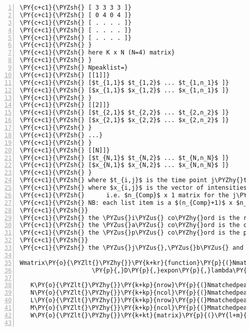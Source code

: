 \begin{Verbatim}[commandchars=\\\{\},codes={\catcode`\$=3\catcode`\^=7\catcode`\_=8},gobble=0,numbers=left,fontfamily=fvm,fontshape=n,fontsize=\footnotesize,tabsize=2]
\PY{c+c1}{\PYZsh{} [ 3 3 3 3 ]}
\PY{c+c1}{\PYZsh{} [ 0 4 0 4 ]}
\PY{c+c1}{\PYZsh{} [ . . . . ]}
\PY{c+c1}{\PYZsh{} [ . . . . ]}
\PY{c+c1}{\PYZsh{} [ . . . . ]}
\PY{c+c1}{\PYZsh{} }
\PY{c+c1}{\PYZsh{} here K x N (N=4) matrix}
\PY{c+c1}{\PYZsh{} }
\PY{c+c1}{\PYZsh{} Npeaklist=}
\PY{c+c1}{\PYZsh{} [[1]]}
\PY{c+c1}{\PYZsh{} [$t_{1,1}$ $t_{1,2}$ ... $t_{1,n_1}$ ]}
\PY{c+c1}{\PYZsh{} [$x_{1,1}$ $x_{1,2}$ ... $x_{1,n_1}$ ]}
\PY{c+c1}{\PYZsh{} }
\PY{c+c1}{\PYZsh{} [[2]]}
\PY{c+c1}{\PYZsh{} [$t_{2,1}$ $t_{2,2}$ ... $t_{2,n_2}$ ]}
\PY{c+c1}{\PYZsh{} [$x_{2,1}$ $x_{2,2}$ ... $x_{2,n_2}$ ]}
\PY{c+c1}{\PYZsh{} }
\PY{c+c1}{\PYZsh{} ...}
\PY{c+c1}{\PYZsh{} }
\PY{c+c1}{\PYZsh{} [[N]]}
\PY{c+c1}{\PYZsh{} [$t_{N,1}$ $t_{N,2}$ ... $t_{N,n_N}$ ]}
\PY{c+c1}{\PYZsh{} [$x_{N,1}$ $x_{N,2}$ ... $x_{N,n_N}$ ]}
\PY{c+c1}{\PYZsh{} }
\PY{c+c1}{\PYZsh{} where $t_{i,j}$ is the time point j\PYZhy{}th peak for the i\PYZhy{}th spectrum}
\PY{c+c1}{\PYZsh{} where $x_{i,j}$ is the vector of intensities ($n_{Comp}$ long)  }
\PY{c+c1}{\PYZsh{}      i.e. $n_{Comp}$ x 1 matrix for the j\PYZhy{}th peak for the i\PYZhy{}th spectrum}
\PY{c+c1}{\PYZsh{} NB: each list item is a $(n_{Comp}+1)$ x $n_N$ matrix}
\PY{c+c1}{\PYZsh{}}
\PY{c+c1}{\PYZsh{} the \PYZus{}i\PYZus{} co\PYZhy{}ord is the row in the Nmatchedpeaks}
\PY{c+c1}{\PYZsh{} the \PYZus{}a\PYZus{} co\PYZhy{}ord is the column number of Nmatchedpeaks (the spectrum number)}
\PY{c+c1}{\PYZsh{} the \PYZus{}p\PYZus{} co\PYZhy{}ord is the peak number for the \PYZus{}a\PYZus{}th spectrum}
\PY{c+c1}{\PYZsh{}}
\PY{c+c1}{\PYZsh{} the \PYZus{}j\PYZus{},\PYZus{}b\PYZus{} and \PYZus{}q\PYZus{} co\PYZhy{}ords are defined similarly for the M\PYZhy{}alignment}

Wmatrix\PY{o}{\PYZlt{}\PYZhy{}}\PY{k+kr}{function}\PY{p}{(}Nmatchedpeaks\PY{p}{,}Npeaklists\PY{p}{,}Mmatchedpeaks\PY{p}{,}Mpeaklists
					\PY{p}{,}D\PY{p}{,}expon\PY{p}{,}lambda\PY{p}{)}\PY{p}{\PYZob{}}

   K\PY{o}{\PYZlt{}\PYZhy{}}\PY{k+kp}{nrow}\PY{p}{(}Nmatchedpeaks\PY{p}{)}
   N\PY{o}{\PYZlt{}\PYZhy{}}\PY{k+kp}{ncol}\PY{p}{(}Nmatchedpeaks\PY{p}{)}
   L\PY{o}{\PYZlt{}\PYZhy{}}\PY{k+kp}{nrow}\PY{p}{(}Mmatchedpeaks\PY{p}{)}
   M\PY{o}{\PYZlt{}\PYZhy{}}\PY{k+kp}{ncol}\PY{p}{(}Mmatchedpeaks\PY{p}{)}
   W\PY{o}{\PYZlt{}\PYZhy{}}\PY{k+kt}{matrix}\PY{p}{(}\PY{l+m}{0}\PY{p}{,}nrow\PY{o}{=}K\PY{p}{,}ncol\PY{o}{=}L\PY{p}{)}
   

\end{Verbatim}
